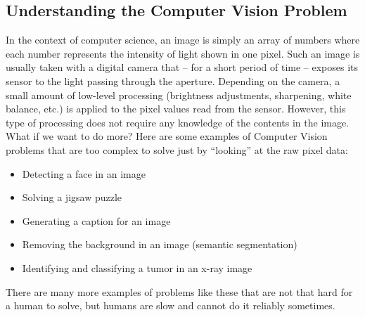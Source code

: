 \documentclass[a4paper]{article}
\begin{document}
	\subsection{Understanding the Computer Vision Problem}
		In the context of computer science, an image is simply an array of numbers where each number represents the intensity of light shown in one pixel.
		Such an image is usually taken with a digital camera that -- for a short period of time -- exposes its sensor to the light passing through the aperture.
		Depending on the camera, a small amount of low-level processing (brightness adjustments, sharpening, white balance, etc.\@) is applied to the pixel values read from the sensor.
		However, this type of processing does not require any knowledge of the contents in the image.
		What if we want to do more? 
		Here are some examples of Computer Vision problems that are too complex to solve just by ``looking'' at the raw pixel data:
		\begin{itemize}
			\item Detecting a face in an image 
			\item Solving a jigsaw puzzle
			\item Generating a caption for an image
			\item Removing the background in an image (semantic segmentation)
			\item Identifying and classifying a tumor in an x-ray image
		\end{itemize}
		There are many more examples of problems like these that are not that hard for a human to solve, but humans are slow and cannot do it reliably sometimes.
		
\end{document}
